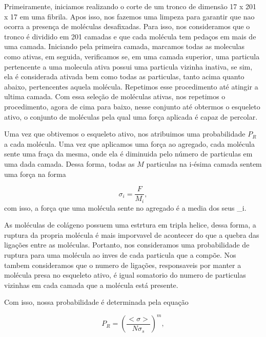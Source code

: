 \documentclass{article}
\begin{document}
        Primeiramente, iniciamos realizando o corte de um tronco de dimensão 17 x 201 x 17 em uma fibrila. Apos isso, nos fazemos uma limpeza 
        para garantir que nao ocorra a presença de moléculas desafixadas. Para isso, nos consideramos que o tronco é dividido em 201 camadas e que
        cada molécula tem pedaços em mais de uma camada. Iniciando pela primeira camada, marcamos todas as moleculas como ativas, em seguida, 
        verificamos se, em uma camada superior, uma particula pertencente a uma molecula ativa possui uma particula vizinha inativa, se sim, ela
        é considerada ativada bem como todas as particulas, tanto acima quanto abaixo, pertencentes aquela molécula. Repetimos esse procedimento 
        até atingir a ultima camada. Com essa seleção de moléculas ativas, nos repetimos o procedimento, agora de cima para baixo, nesse conjunto 
        até obtermos o esqueleto ativo, o conjunto de moléculas pela qual uma força aplicada é capaz de percolar. 

        Uma vez que obtivemos o esqueleto ativo, nos atribuimos uma probabilidade $P_{R}$ a cada molécula. Uma vez que aplicamos uma força ao agregado,
        cada molécula sente uma fraça da mesma, onde ela é diminuida pelo número de particulas em uma dada camada. Dessa forma, todas as $M$ particulas 
        na i-ésima camada sentem uma força na forma 

        \begin{equation}
            \sigma_{i} = \frac{F}{M_{i}},
        \end{equation}
        \noindent com isso, a força que uma molécula sente no agregado é a media dos seus \sigma_{i}.

        As moléculas de colágeno possuem uma estrtura em tripla helice\cite{BRODSKY1997545}, dessa forma, a ruptura da propria molécula é mais imporvavel 
        de acontecer do que a quebra das ligações entre as moléculas\cite{Parkinson1997}. Portanto, nos consideramos uma probabilidade de ruptura para uma
        molécula ao inves de cada particula que a compõe. Nos tambem consideramos que o numero de ligações, responsaveis por manter a molécula presa no 
        esqueleto ativo, é igual somatorio do numero de particulas vizinhas em cada camada que a molécula está presente.

        Com isso, nossa probabilidade é determinada pela equação

        \begin{equation}
            P_{R} = (\frac{<\sigma>}{N\sigma_{s}})^{m},
        \end{equation}
\end{document}
